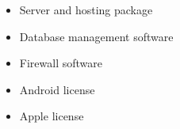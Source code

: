 \begin{itemize}
	\item Server and hosting package
	\item Database management software 
	\item Firewall software
	\item Android license 
	\item Apple license 
\end{itemize}

